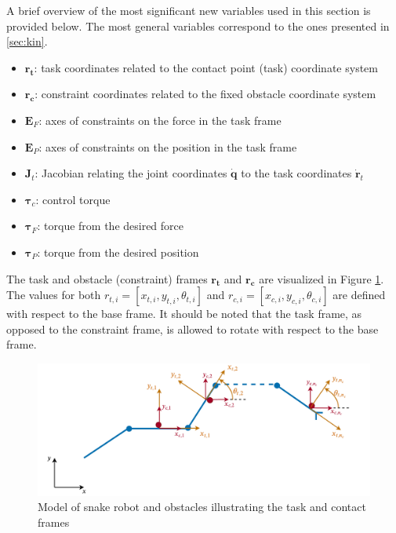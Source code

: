 A brief overview of the most significant new variables used in this section is provided below.
The most general variables correspond to the ones presented in \ref{sec:kin}.

\begin{itemize}
    \item $\mathbf{r_t}$: task coordinates related to the contact point (task) coordinate system
    \item $\mathbf{r_c}$: constraint coordinates related to the fixed obstacle coordinate system
    \item $\mathbf{E}_F$: axes of constraints on the force in the task frame
    \item $\mathbf{E}_P$: axes of constraints on the position in the task frame
    \item $\mathbf{J}_t$: Jacobian relating the joint coordinates $\dot{\mathbf{q}}$ to the task coordinates $\dot{\mathbf{r}}_t$
    \item $\boldsymbol{\tau}_c$: control torque
    \item $\boldsymbol{\tau}_F$: torque from the desired force
    \item $\boldsymbol{\tau}_P$: torque from the desired position
\end{itemize}

The task and obstacle (constraint) frames $\mathbf{r_t}$ and $\mathbf{r_c}$ are visualized in Figure \ref{fig:rt-rc}. The values for both $r_{t,i} = [x_{t,i}, y_{t,i}, \theta_{t,i}]$ and $r_{c,i} = [x_{c,i}, y_{c,i}, \theta_{c,i}]$ are defined with respect to the base frame. It should be noted that the task frame, as opposed to the constraint frame, is allowed to rotate with respect to the base frame.

\begin{figure}[h!]
    \centering
    \includegraphics[width=\textwidth]{figures/theory/rt-rc.pdf}
    \caption{Model of snake robot and obstacles illustrating the task and contact frames}
    \label{fig:rt-rc}
\end{figure}


